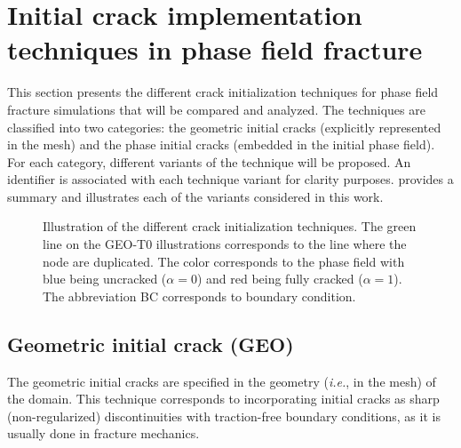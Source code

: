 \documentclass[OptSoft]{jtcam_preprint}
\begin{document}
\section{Initial crack implementation techniques in phase field fracture}
\label{sec:crack_initialization_techniques}

This section presents the different crack initialization techniques for phase field fracture simulations that will be compared and analyzed.
The techniques are classified into two categories: the geometric initial cracks (explicitly represented in the mesh) and the phase initial cracks (embedded in the initial phase field).
For each category, different variants of the technique will be proposed.
An identifier is associated with each technique variant for clarity purposes.
 provides a summary and illustrates each of the variants considered in this work.

\begin{figure}
  \centering
  
  \caption{Illustration of the different crack initialization techniques. The green line on the GEO-T0 illustrations corresponds to the line where the node are duplicated. The color corresponds to the phase field with blue being uncracked ($\alpha=0$) and red being fully cracked ($\alpha=1$). The abbreviation BC corresponds to boundary condition.}
  \label{fig:crack_initialization_techniques}
\end{figure}


\subsection{Geometric initial crack (GEO)}

The geometric initial cracks are specified in the geometry (\emph{i.e.}, in the mesh) of the domain.
This technique corresponds to incorporating initial cracks as sharp (non-regularized) discontinuities with traction-free boundary conditions, as it is usually done in fracture mechanics.
\end{document}
